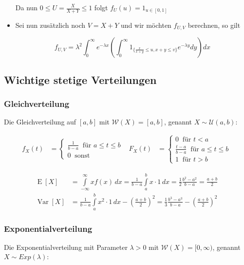 \documentclass[25pt]{sciposter}
\newcommand{\W}{\mathcal{W}}
\newcommand{\U}{\mathcal{U}}
\newcommand{\Var}{\operatorname{Var}}
\newcommand{\E}{\operatorname{E}}
\begin{document}
\begin{multicols}{3}
\begin{itemize}
Da nun $0 \leq U = \frac{X}{X+Y} \leq 1$ folgt $f_U(u) = 1_{u\in[0,1]}$

\item Sei nun zusätzlich noch $V=X+Y$ und wir möchten $f_{U,V}$ berechnen, so gilt

$$f_{U,V} = \lambda^2 \int_{0}^{\infty} e^{-\lambda x} \left(\int_{0}^{\infty} 1_{\{\frac{x}{x+y}\leq u, x+y \leq v\}} e^{-\lambda y}dy \right) dx$$

\end{itemize}





\subsection*{Wichtige stetige Verteilungen}

\subsubsection*{Gleichverteilung}
Die Gleichverteilung auf $[a,b]$ mit $\W(X)=[a,b]$, genannt $X\sim\U(a,b)$:

\begin{align*}
	f_X(t) &= \begin{cases}
	\frac{1}{b-a} \ \text{ für } a \leq t \leq b\\
	0 \ \text{ sonst}
	\end{cases}
	& 
	F_X(t) &= \begin{cases}
	0 \ \text{ für } t<a \\
	\frac{t-a}{b-a} \ \text{ für } a \leq t \leq b\\
	1 \ \text{ für } t > b
	\end{cases}
\end{align*}


\begin{align*}
\E[X] &= {\displaystyle\int \limits _{-\infty }^{\infty }xf(x)\,dx={\frac {1}{b-a}}\int \limits _{a}^{b}x\cdot 1\,dx={\frac {1}{2}}{\frac {b^{2}-a^{2}}{b-a}}={\frac {a+b}{2}}} \\ \Var[X] &={\frac {1}{b-a}}\int \limits _{a}^{b}{x^{2}\cdot 1\,dx}-\left({\frac {a+b}{2}}\right)^{2}={\frac {1}{3}}{\frac {b^{3}-a^{3}}{b-a}}-\left({\frac {a+b}{2}}\right)^{2}
\end{align*}




\subsubsection*{Exponentialverteilung}
Die Exponentialverteilung mit Parameter $\lambda > 0$ mit $\W(X)=[0,\infty)$, genannt $X\sim Exp(\lambda)$:


\end{multicols}
\end{document}
